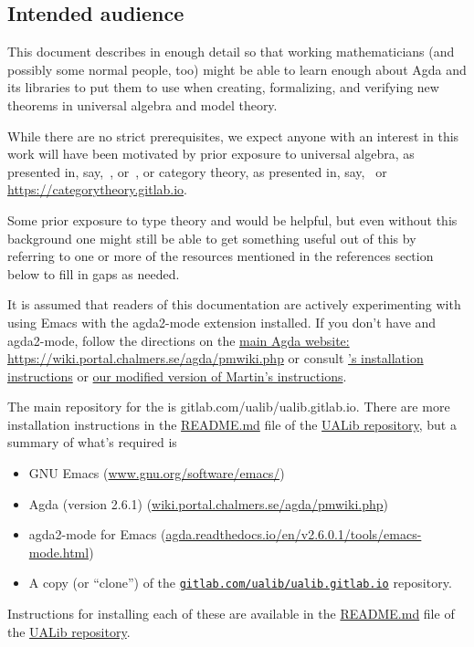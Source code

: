 \subsection*{Intended audience}
This document describes \agdaualib in enough detail so that working mathematicians (and possibly some normal people, too) might be able to learn enough about Agda and its libraries to put them to use when creating, formalizing, and verifying new theorems in universal algebra and model theory.

While there are no strict prerequisites, we expect anyone with an interest in this work will have been motivated by prior exposure to universal algebra, as presented in, say,~\cite{Bergman:2012}, or~\cite{McKenzie:1987}, or category theory, as presented in, say,~\cite{Riehl:2017} or \url{https://categorytheory.gitlab.io}.

Some prior exposure to type theory and \agda would be helpful, but even without this background one might still be able to get something useful out of this by referring to one or more of the resources mentioned in the references section below to fill in gaps as needed.

It is assumed that readers of this documentation are actively experimenting with \agda using Emacs with the
agda2-mode extension installed. If you don't have \agda and agda2-mode, follow the directions on the \href{https://wiki.portal.chalmers.se/agda/pmwiki.php}{main Agda website: https://wiki.portal.chalmers.se/agda/pmwiki.php} or
consult \href{https://github.com/martinescardo/HoTT-UF-Agda-Lecture-Notes/blob/master/INSTALL.md}{\MartinEscardo's installation instructions} or \href{https://gitlab.com/ualib/ualib.gitlab.io/-/blob/master/INSTALL_AGDA.md}{our
modified version of Martin's instructions}.

The main repository for the \agdaualib is gitlab.com/ualib/ualib.gitlab.io. There are more installation instructions in the \href{https://gitlab.com/ualib/ualib.gitlab.io/README.md}{README.md} file of the \href{https://gitlab.com/ualib/ualib.gitlab.io}{UALib repository}, but a summary of what's required is
\begin{itemize}
\item GNU Emacs (\url{www.gnu.org/software/emacs/})
\item Agda (version 2.6.1) (\url{wiki.portal.chalmers.se/agda/pmwiki.php})
\item agda2-mode for Emacs (\url{agda.readthedocs.io/en/v2.6.0.1/tools/emacs-mode.html})
\item A copy (or ``clone'') of the \href{gitlab.com/ualib/ualib.gitlab.io}{\texttt{gitlab.com/ualib/ualib.gitlab.io}} repository.
\end{itemize}
Instructions for installing each of these are available in the \href{https://gitlab.com/ualib/ualib.gitlab.io/README.md}{README.md} file of the \href{https://gitlab.com/ualib/ualib.gitlab.io}{UALib repository}.

